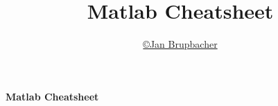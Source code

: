 % 
%

\newcommand{\Author}{\copyright Jan Brupbacher}
\newcommand{\Title}{Matlab Cheatsheet}

\author{\href{mailto:jan.brupbacher@hsr.ch}{\Author}}
\title{\Title}



%


	\textbf{\huge \Title}\\
	\lstset{style=Matlab}
	

